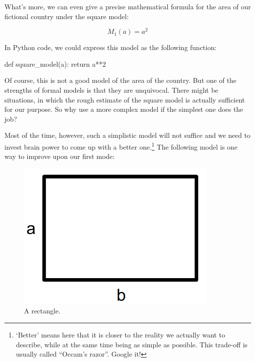 \documentclass[
  a4paperpaper,
  ,captions=tableheading
]{scrbook}
\newenvironment{Shaded}{\begin{snugshade}}{\end{snugshade}}
\newcommand{\ControlFlowTok}[1]{\textcolor[rgb]{0.00,0.23,0.31}{#1}}
\newcommand{\DecValTok}[1]{\textcolor[rgb]{0.68,0.00,0.00}{#1}}
\newcommand{\KeywordTok}[1]{\textcolor[rgb]{0.00,0.23,0.31}{#1}}
\newcommand{\NormalTok}[1]{\textcolor[rgb]{0.00,0.23,0.31}{#1}}
\newcommand{\OperatorTok}[1]{\textcolor[rgb]{0.37,0.37,0.37}{#1}}
\begin{document}
What's more, we can even give a precise mathematical formula for the
area of our fictional country under the square model:

\[M_1(a) = a^2\]

In Python code, we could express this model as the following function:

\begin{Shaded}
\begin{Highlighting}[]
\KeywordTok{def}\NormalTok{ square\_model(a):}
    \ControlFlowTok{return}\NormalTok{ a}\OperatorTok{**}\DecValTok{2}
\end{Highlighting}
\end{Shaded}

Of course, this is not a good model of the area of the country. But one
of the strengths of formal models is that they are unquivocal. There
might be situations, in which the rough estimate of the square model is
actually sufficient for our purpose. So why use a more complex model if
the simplest one does the job?

Most of the time, however, such a simplistic model will not suffice and
we need to invest brain power to come up with a better one.\footnote{`Better'
  means here that it is closer to the reality we actually want to
  describe, while at the same time being as simple as possible. This
  trade-off is usually called ``Occam's razor''. Google it!} The
following model is one way to improve upon our first mode:

\begin{figure}

{\centering \includegraphics{img/rectangle.png}

}

\caption{A rectangle.}

\end{figure}
\end{document}
